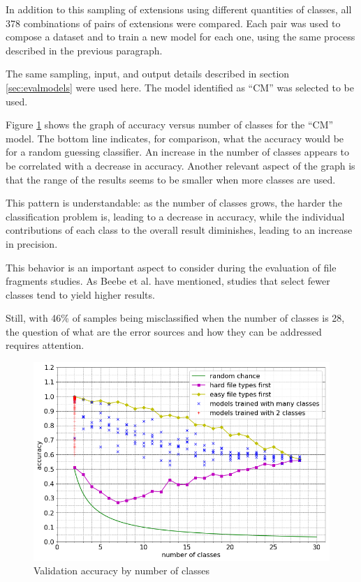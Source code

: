 In addition to this sampling of extensions using different quantities of classes, all 378 combinations of pairs of extensions were compared. Each pair was used to compose a dataset and to train a new model for each one, using the same process described in the previous paragraph.

The same sampling, input, and output details described in section \ref{sec:evalmodels} were used here. The model identified as ``CM'' was selected to be used.

Figure \ref{fig:nclasses} shows the graph of accuracy versus number of classes for the ``CM'' model. The bottom line indicates, for comparison, what the accuracy would be for a random guessing classifier. An increase in the number of classes appears to be  correlated with a decrease in accuracy. Another relevant aspect of the graph is that the range of the results seems to be smaller when more classes are used.  

This pattern is understandable: as the number of classes grows, the harder the classification problem is, leading to a decrease in accuracy, while the individual contributions of each class to the overall result diminishes, leading to an increase in precision.

This behavior is an important aspect to consider during the evaluation of file fragments studies. As Beebe et al. \cite{beebe_sceadan:_2013} have mentioned, studies that select fewer classes tend to yield higher results. 

Still, with 46\%  of samples being misclassified when the number of classes is 28, the question of what are the error sources and how they can be addressed requires attention.

\noindent
\begin{figure}[htb!]
\centering\includegraphics[width=1.0\textwidth]{content/nclasses.png}
\caption{\label{fig:nclasses}Validation accuracy by number of classes}%
\end{figure}

